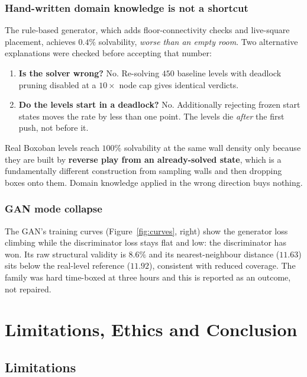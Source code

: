 \documentclass[11pt,a4paper]{report}
\begin{document}
\subsection{Hand-written domain knowledge is not a shortcut}

The rule-based generator, which adds floor-connectivity checks and live-square
placement, achieves $0.4\%$ solvability, \emph{worse than an empty room}. Two
alternative explanations were checked before accepting that number:

\begin{enumerate}[leftmargin=1.5em,itemsep=2pt]
\item \textbf{Is the solver wrong?} No. Re-solving $450$ baseline levels with
      deadlock pruning disabled at a $10\times$ node cap gives identical
      verdicts.
\item \textbf{Do the levels start in a deadlock?} No. Additionally rejecting
      frozen start states moves the rate by less than one point. The levels die
      \emph{after} the first push, not before it.
\end{enumerate}

Real Boxoban levels reach $100\%$ solvability at the same wall density only
because they are built by \textbf{reverse play from an already-solved state},
which is a fundamentally different construction from sampling walls and then
dropping boxes onto them. Domain knowledge applied in the wrong direction buys
nothing.

\subsection{GAN mode collapse}

The GAN's training curves (Figure~\ref{fig:curves}, right) show the generator
loss climbing while the discriminator loss stays flat and low: the
discriminator has won. Its raw structural validity is $8.6\%$ and its
nearest-neighbour distance ($11.63$) sits below the real-level reference
($11.92$), consistent with reduced coverage. The family was hard time-boxed at
three hours and this is reported as an outcome, not repaired.

\chapter{Limitations, Ethics and Conclusion}
\label{ch:conclusion}

\section{Limitations}
\end{document}
